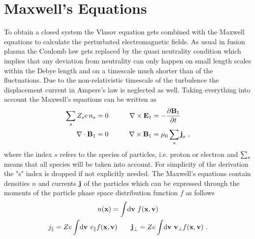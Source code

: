 \section{Maxwell's Equations}
\label{sec:maxwellEquations}

To obtain a closed system the Vlasov equation gets combined with the Maxwell equations to calculate the perturbated electromagnetic fields. As usual in fusion plasma the Coulomb law gets replaced by the quasi neutrality condition which implies that any deviation from neutrality can only happen on small length scales within the Debye length and on a timescale much shorter than of the fluctuations. Due to the non-relativistic timescale of the turbulence the displacement current in Ampere's law is neglected as well. Taking everything into account the Maxwell's equations can be written as
\begin{gather}
	\begin{aligned}
		\sum_s Z_s e \, n_s &= 0  &\qquad \nabla \times \boldsymbol{\mathbf{E}}_1 &= - \frac{\partial \boldsymbol{\mathbf{B}}_1}{\partial t}\\
		\nabla \cdot \boldsymbol{\mathbf{B}}_1 &= 0 &\qquad \nabla \times \boldsymbol{\mathbf{B}}_1 &= \mu_0 \sum_s \boldsymbol{\mathbf{j}}_s~,
	\end{aligned}
	\label{eq:maxwellEquations}
\end{gather}
where the index $s$ refers to the species of particles, i.e. proton or electron and $\sum_s$ means that all species will be taken into account. For simplicity of the derivation the "s" index is dropped if not explicitly needed. The Maxwell's equations contain densities $n$ and currents $\boldsymbol{\mathbf{j}}$ of the particles which can be expressed through the moments of the particle phase space distribution function $f$ as follows
\begin{gather}
	n(\boldsymbol{\mathbf{x}}) = \int \! \mathrm{d}\boldsymbol{\mathbf{v}} ~ f(\boldsymbol{\mathbf{x}}, \boldsymbol{\mathbf{v}}) \\
	j_\parallel = Ze \int \! \mathrm{d}\boldsymbol{\mathbf{v}} ~ v_\parallel f(\boldsymbol{\mathbf{x}}, \boldsymbol{\mathbf{v}}) \qquad \boldsymbol{\mathbf{j}}_\perp = Ze \int \! \mathrm{d}\boldsymbol{\mathbf{v}} ~ \boldsymbol{\mathbf{v}}_\perp f(\boldsymbol{\mathbf{x}}, \boldsymbol{\mathbf{v}})~.
	\label{eq:momentsParticleSpace}
\end{gather}
\newpage